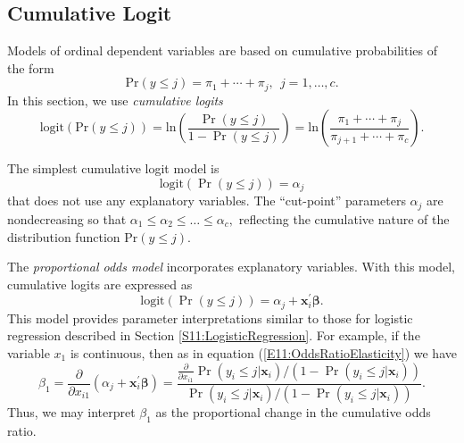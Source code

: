 
\linejed
\bigskip

\subsection{Cumulative Logit}
Models of ordinal dependent variables are based on cumulative
probabilities of the form
\begin{equation*}
\mathrm{Pr} ( y \leq j ) = \pi_1 + \cdots + \pi_j, ~ ~ j=1, \ldots,
c .
\end{equation*}
In this section, we use \emph{cumulative logits}
\begin{equation}\label{E11:CumLogitProbs}
\mathrm{logit}\left(\mathrm{Pr} ( y \leq j ) \right) = \mathrm{ln}
\left(\frac{\Pr ( y \leq j )}{1-\Pr ( y \leq j )}
 \right)
= \mathrm{ln} \left(\frac{\pi_1 + \cdots + \pi_j}{\pi_{j+1} + \cdots
+ \pi_c}
 \right) .
\end{equation}

The simplest cumulative logit model is
\begin{equation*}
\mathrm{logit}\left(\Pr ( y \leq j ) \right) = \alpha_j
\end{equation*}
that does not use any explanatory variables. The ``cut-point''
parameters $\alpha_j$ are nondecreasing so that $\alpha_1 \leq
\alpha_2 \leq \ldots \leq \alpha_c,$ reflecting the cumulative
nature of the distribution function $\mathrm{Pr} ( y \leq j )$.

The \emph{proportional odds model} incorporates explanatory
variables. With this model, cumulative logits are expressed as
\begin{equation}\label{E11:CumLogitProb}
\mathrm{logit}\left(\Pr ( y \leq j ) \right)  = \alpha_j +
\mathbf{x}_i^{\prime} \boldsymbol \beta .
\end{equation}
This model provides parameter interpretations similar to those for
logistic regression described in Section
\ref{S11:LogisticRegression}. For example, if the variable $x_1$ is
continuous, then as in equation (\ref{E11:OddsRatioElasticity}) we
have
\begin{equation*}
\beta_1 = \frac{\partial }{\partial x_{i1}}\left( \alpha_j +
\mathbf{x}_i^{\prime}\boldsymbol \beta \right) =
\frac{\frac{\partial }{\partial x_{i1}}\Pr (y_i \leq
j|\mathbf{x}_i)/\left( 1-\Pr (y_i\leq j|\mathbf{x}_i)\right) }{\Pr
(y_i\leq j|\mathbf{x}_i)/\left( 1-\Pr (y_i\leq
j|\mathbf{x}_i)\right) }.
\end{equation*}
Thus, we may interpret $\beta_1$ as the proportional change in the
cumulative odds ratio.

